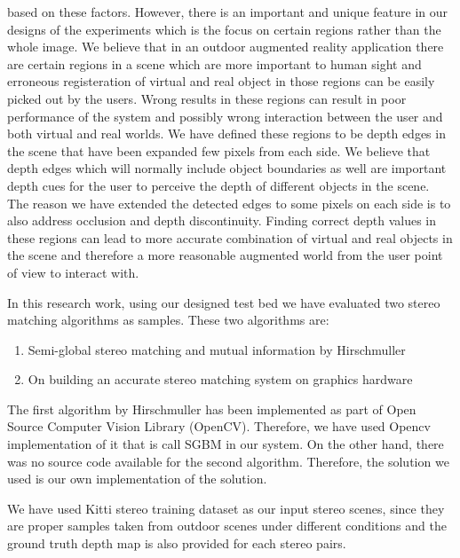 \documentclass[dvips,letterpaper,12pt]{report}
\begin{document}
based on these factors. However, there is an important and unique feature in our designs of the experiments which is the focus on certain regions rather than the whole image. 
We believe that in an outdoor augmented reality application there are certain regions in a scene which are more important to human sight and erroneous registeration of virtual and 
real object in those regions can be easily picked out by the users. Wrong results in these regions can result in poor performance of the system and possibly wrong interaction between 
the user and both virtual and real worlds. We have defined these regions to be depth edges in the scene that have been expanded few pixels from each side. 
We believe that depth edges which will normally include object boundaries as well are important depth cues for the user to perceive the depth of different objects in the scene. 
The reason we have extended the detected edges to some pixels on each side is to also address occlusion and depth discontinuity. Finding correct depth values in these regions 
can lead to more accurate combination of virtual and real objects in the scene and therefore a more reasonable augmented world from the user point of view to interact with. \newline

In this research work, using our designed test bed we have evaluated two stereo matching algorithms as samples. These two algorithms are:
\begin{enumerate}
\item Semi-global stereo matching and mutual information by Hirschmuller \cite{hir08}
\item On building an accurate stereo matching system on graphics hardware \cite{mei11}
\end{enumerate}

The first algorithm by Hirschmuller has been implemented as part of Open Source Computer Vision Library (OpenCV). Therefore, we have used Opencv implementation of it that is 
call SGBM in our system. On the other hand, there was no source code available for the second algorithm. Therefore, the solution we used is our own implementation of the solution.

We have used Kitti stereo training dataset as our input stereo scenes, since they are proper samples taken from outdoor scenes under different conditions and the ground truth depth map
is also provided for each stereo pairs.




 
\end{document}
